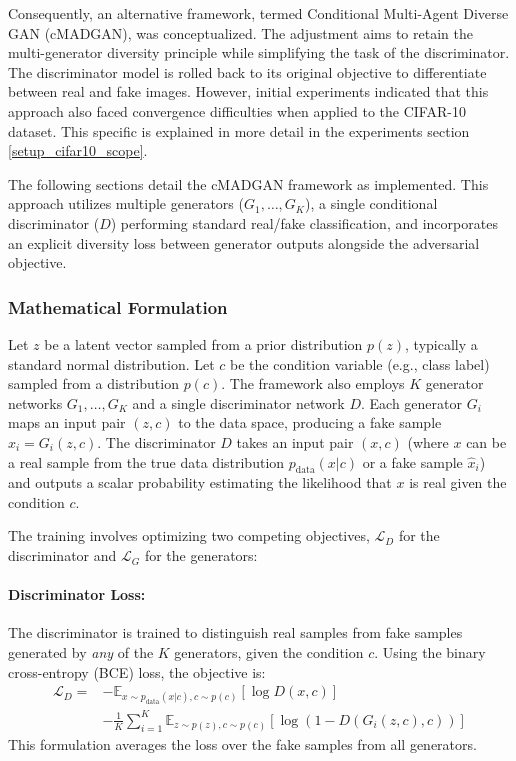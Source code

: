 Consequently, an alternative framework, termed Conditional Multi-Agent Diverse GAN (cMADGAN), was conceptualized. The adjustment aims to retain the multi-generator diversity principle while simplifying the task of the discriminator. The discriminator model is rolled back to its original objective to differentiate between real and fake images. However, initial experiments indicated that this approach also faced convergence difficulties when applied to the CIFAR-10 dataset. This specific is explained in more detail in the experiments section \ref{setup_cifar10_scope}.

The following sections detail the cMADGAN framework as implemented. This approach utilizes multiple generators ($G_1, \dots, G_K$), a single conditional discriminator ($D$) performing standard real/fake classification, and incorporates an explicit diversity loss between generator outputs alongside the adversarial objective.

\subsubsection{Mathematical Formulation}
\label{theoretical_cmadgan_math}

Let $z$ be a latent vector sampled from a prior distribution $p(z)$, typically a standard normal distribution. Let $c$ be the condition variable (e.g., class label) sampled from a distribution $p(c)$. The framework also employs $K$ generator networks $G_1, \dots, G_K$ and a single discriminator network $D$. Each generator $G_i$ maps an input pair $(z, c)$ to the data space, producing a fake sample $\hat{x}_i = G_i(z, c)$. The discriminator $D$ takes an input pair $(x, c)$ (where $x$ can be a real sample from the true data distribution $p_{\text{data}}(x|c)$ or a fake sample $\hat{x}_i$) and outputs a scalar probability estimating the likelihood that $x$ is real given the condition $c$.

The training involves optimizing two competing objectives, $\mathcal{L}_D$ for the discriminator and $\mathcal{L}_G$ for the generators:
\newpage

\paragraph{Discriminator Loss:}
The discriminator is trained to distinguish real samples from fake samples generated by \textit{any} of the $K$ generators, given the condition $c$. Using the binary cross-entropy (BCE) loss, the objective is:
\begin{equation}
\label{eq:cmadgan_loss_d}
\begin{split}
\mathcal{L}_D = & - \mathbb{E}_{x \sim p_{\text{data}}(x|c), c \sim p(c)} [\log D(x, c)] \\
& - \frac{1}{K} \sum_{i=1}^{K} \mathbb{E}_{z \sim p(z), c \sim p(c)} [\log(1 - D(G_i(z, c), c))]
\end{split}
\end{equation}
This formulation averages the loss over the fake samples from all generators.

